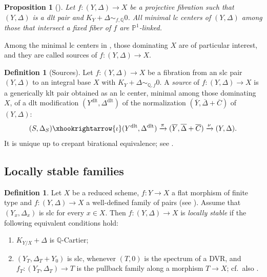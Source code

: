 \documentclass{amsart}
\newtheorem{prop}[theorem]{Proposition}
\theoremstyle{definition}
\newtheorem{defn}[theorem]{Definition}
\theoremstyle{remark}
\def\bQ{\mathbb{Q}}
\def\bP{\mathbb{P}}
\newcommand{\dlt}{\operatorname{dlt}}
\numberwithin{equation}{section}
\begin{document}
\begin{prop}[{\cite[Thm.~4.40]{kol13}}] \label{prop:P1link} Let $f \colon (Y, \Delta) \to X$ be a projective fibration such that $(Y, \Delta)$ is a dlt pair and $K_{Y} + \Delta \sim_{f, \bQ} 0$.  All minimal lc centers of $(Y, \Delta)$ among those that intersect a fixed fiber of $f$ are $\bP^1$-linked.
\end{prop}

Among the minimal lc centers in , those dominating $X$ are of particular interest, and they are called sources of $f \colon (Y, \Delta) \to X$.

\begin{defn}[Sources]\label{defnsource} Let $f \colon (Y, \Delta) \to X$ be a fibration from an slc pair $(Y, \Delta)$ to an integral base $X$ with $K_{Y} + \Delta \sim_{\bQ, f} 0$.
A \emph{source} of $f \colon (Y,\Delta) \to X$
is a generically klt
pair obtained as an lc center, minimal among those dominating $X$, of a dlt modification $(Y^{\dlt}, \Delta^{\dlt})$ of the normalization $(\overline{Y}, \overline{\Delta}+\overline{C})$ of $(Y, \Delta)$:
\begin{equation}\label{eq:source}
(S, \Delta_S) 
\xhookrightarrow{\iota}
(Y^{\dlt}, \Delta^{\dlt}) 
\xrightarrow{\pi} 
(\overline{Y}, \overline{\Delta}+\overline{C}) 
\xrightarrow{\nu}
(Y, \Delta).
\end{equation}
It is unique up to crepant birational equivalence; see \cite[\S 4.5]{kol13}.
\end{defn}


\subsection{Locally stable families}
\begin{defn}
Let $X$ be a reduced scheme, $f \colon Y \to X$ a flat morphism of finite type
and $f \colon (Y, \Delta) \to X$ a well-defined family of pairs (see  \cite[Thm.-Def.~4.7]{kbook}). Assume that $(Y_x, \Delta_x)$ is slc for every $x \in X$. Then $f \colon (Y, \Delta) \to X$ is \emph{locally
stable} if the following equivalent conditions hold:
\begin{enumerate}
\item $K_{Y/X} + \Delta$ is $\bQ$-Cartier;
\item $(Y_{T}, \Delta_T + Y_0)$ is slc, whenever $(T, 0)$ is the spectrum of a DVR, and $f_T \colon (Y_T, \Delta_T) \to T$ is the pullback family along a morphism $T \to X$; cf.\ also \cite[Thm.-Def.~2.3]{kbook}.
\end{enumerate}
\end{defn}
\end{document}
